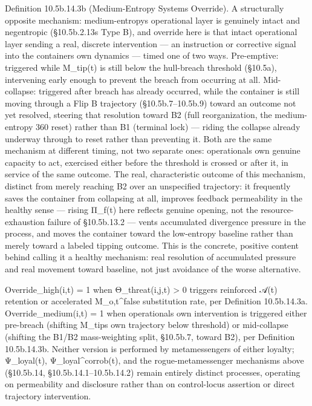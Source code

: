 \documentclass[
]{article}
\begin{document}
Definition 10.5b.14.3b (Medium-Entropy Systems Override). A structurally
opposite mechanism: medium-entropy\textquotesingle s operational layer
is genuinely intact and negentropic (§10.5b.2.13\textquotesingle s Type
B), and override here is that intact operational layer sending a real,
discrete intervention --- an instruction or corrective signal into the
container\textquotesingle s own dynamics --- timed one of two ways.
Pre-emptive: triggered while M\_tip(t) is still below the hull-breach
threshold (§10.5a), intervening early enough to prevent the breach from
occurring at all. Mid-collapse: triggered after breach has already
occurred, while the container is still moving through a Flip B
trajectory (§10.5b.7--10.5b.9) toward an outcome not yet resolved,
steering that resolution toward B2 (full reorganization, the
medium-entropy 360 reset) rather than B1 (terminal lock) --- riding the
collapse already underway through to reset rather than preventing it.
Both are the same mechanism at different timing, not two separate ones:
operational\textquotesingle s own genuine capacity to act, exercised
either before the threshold is crossed or after it, in service of the
same outcome. The real, characteristic outcome of this mechanism,
distinct from merely reaching B2 over an unspecified trajectory: it
frequently saves the container from collapsing at all, improves feedback
permeability in the healthy sense --- rising Π\_f(t) here reflects
genuine opening, not the resource-exhaustion failure of §10.5b.13.2 ---
vents accumulated divergence pressure in the process, and moves the
container toward the low-entropy baseline rather than merely toward a
labeled tipping outcome. This is the concrete, positive content behind
calling it a healthy mechanism: real resolution of accumulated pressure
and real movement toward baseline, not just avoidance of the worse
alternative.

Override\_high(i,t) = 1 when Θ\_threat(i,j,t) \textgreater{} 0 triggers
reinforced 𝒜(t) retention or accelerated M\_o,t\^{}false substitution
rate, per Definition 10.5b.14.3a. Override\_medium(i,t) = 1 when
operational\textquotesingle s own intervention is triggered either
pre-breach (shifting M\_tip\textquotesingle s own trajectory below
threshold) or mid-collapse (shifting the B1/B2 mass-weighting split,
§10.5b.7, toward B2), per Definition 10.5b.14.3b. Neither version is
performed by metamessengers of either loyalty; Ψ\_loyal(t),
Ψ\_loyal\^{}corrob(t), and the rogue-metamessenger mechanisms above
(§10.5b.14, §10.5b.14.1--10.5b.14.2) remain entirely distinct processes,
operating on permeability and disclosure rather than on control-locus
assertion or direct trajectory intervention.
\end{document}
